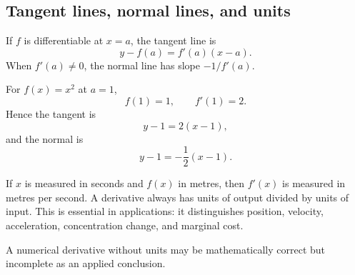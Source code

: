 \subsection{Tangent lines, normal lines, and units}

If \(f\) is differentiable at \(x=a\), the tangent line is
\[
y-f(a)=f'(a)(x-a).
\]
When \(f'(a)\ne0\), the normal line has slope \(-1/f'(a)\).

\begin{examplebox}
For \(f(x)=x^2\) at \(a=1\),
\[
f(1)=1,
\qquad
f'(1)=2.
\]
Hence the tangent is
\[
y-1=2(x-1),
\]
and the normal is
\[
y-1=-\frac12(x-1).
\]
\end{examplebox}

\begin{interpretationbox}
If \(x\) is measured in seconds and \(f(x)\) in metres, then \(f'(x)\) is measured in metres per second. A derivative always has units of output divided by units of input. This is essential in applications: it distinguishes position, velocity, acceleration, concentration change, and marginal cost.
\end{interpretationbox}

\begin{remarkbox}
A numerical derivative without units may be mathematically correct but incomplete as an applied conclusion.
\end{remarkbox}
